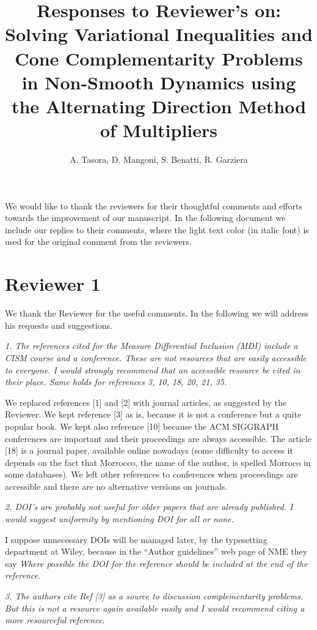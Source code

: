 \documentclass[final,12pt]{article}
\title{ \textbf{Responses to Reviewer's  on:} \\
Solving Variational Inequalities and Cone Complementarity Problems in Non-Smooth Dynamics using the Alternating Direction Method of Multipliers}
\author{A. Tasora, D. Mangoni, S. Benatti, R. Garziera}
\def\reviewercomment#1{{\vskip4mm \color{mycommentcolor} \textit{#1} \vskip2mm}}
\begin{document}
\maketitle




We would like to thank the reviewers for their thoughtful comments and
efforts towards the improvement of our manuscript. In the following document we include
our replies to their comments, where the light text color (in italic font) is used
for the original comment from the reviewers.

\section{Reviewer 1}

We thank the Reviewer for the useful comments. 
In the following we will address his requests and suggestions.


\reviewercomment{
1. The references cited for the Measure Differential Inclusion (MDI) include a CISM course and a
conference. These are not resources that are easily accessible to everyone. I would strongly
recommend that an accessible resource be cited in their place. Same holds for references 3,
10, 18, 20, 21, 35.
}

We replaced references [1] and [2] with journal articles, as suggested by the Reviewer. We kept reference [3] as is, because it is not a conference but a quite popular book. We kept also reference [10] because the ACM SIGGRAPH conferences are important and their proceedings are always accessible. The article [18] is a journal paper, available online nowadays (some difficulty to access it depends on the fact that Morrocco, the name of the author, is spelled Morroco in some databases). We left other references to conferences when proceedings are accessible and there are no alternative versions on journals.  


\reviewercomment{
2. DOI’s are probably not useful for older papers that are already published. I would suggest
uniformity by mentioning DOI for all or none.
}

I suppose unnecessary DOIs will be managed later, by the typesetting department at Wiley, because in the "`Author guidelines"' web page of NME they say \textit{Where possible the DOI for the reference should be included at the end of the reference}. 

\reviewercomment{
3. The authors cite Ref [3] as a source to discussion complementarity problems. But this is not a
resource again available easily and I would recommend citing a more resourceful reference.
}
\end{document}
